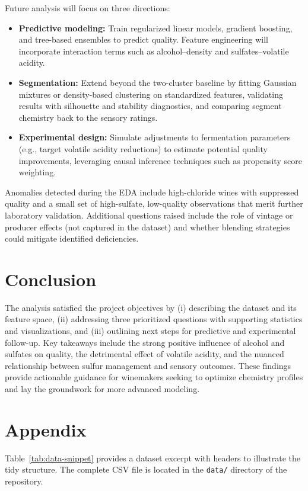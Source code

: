 \documentclass[11pt]{article}
\begin{document}
Future analysis will focus on three directions:
\begin{itemize}
  \item \textbf{Predictive modeling:} Train regularized linear models, gradient boosting, and tree-based ensembles to predict quality. Feature engineering will incorporate interaction terms such as alcohol--density and sulfates--volatile acidity.
  \item \textbf{Segmentation:} Extend beyond the two-cluster baseline by fitting Gaussian mixtures or density-based clustering on standardized features, validating results with silhouette and stability diagnostics, and comparing segment chemistry back to the sensory ratings.
  \item \textbf{Experimental design:} Simulate adjustments to fermentation parameters (e.g., target volatile acidity reductions) to estimate potential quality improvements, leveraging causal inference techniques such as propensity score weighting.
\end{itemize}

Anomalies detected during the EDA include high-chloride wines with suppressed
quality and a small set of high-sulfate, low-quality observations that merit
further laboratory validation. Additional questions raised include the role of
vintage or producer effects (not captured in the dataset) and whether blending
strategies could mitigate identified deficiencies.

\section{Conclusion}
The analysis satisfied the project objectives by (i) describing the dataset and
its feature space, (ii) addressing three prioritized questions with supporting
statistics and visualizations, and (iii) outlining next steps for predictive and
experimental follow-up. Key takeaways include the strong positive influence of
alcohol and sulfates on quality, the detrimental effect of volatile acidity,
and the nuanced relationship between sulfur management and sensory outcomes.
These findings provide actionable guidance for winemakers seeking to optimize
chemistry profiles and lay the groundwork for more advanced modeling.

\section*{Appendix}
Table~\ref{tab:data-snippet} provides a dataset excerpt with headers to
illustrate the tidy structure. The complete CSV file is located in the
\texttt{data/} directory of the repository.
\end{document}
